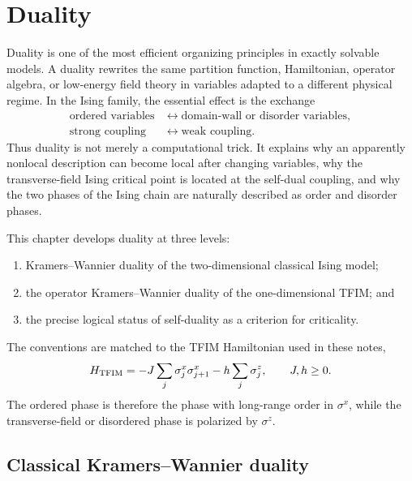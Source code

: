 \chapter{Duality}
\label{chap:duality}

Duality is one of the most efficient organizing principles in exactly solvable
models.  A duality rewrites the same partition function, Hamiltonian, operator
algebra, or low-energy field theory in variables adapted to a different physical
regime.  In the Ising family, the essential effect is the exchange
\begin{equation}
\label{eq:duality-weak-strong-schematic}
\begin{aligned}
    \text{ordered variables}
    &\longleftrightarrow
    \text{domain-wall or disorder variables},\\
    \text{strong coupling}
    &\longleftrightarrow
    \text{weak coupling}.
\end{aligned}
\end{equation}
Thus duality is not merely a computational trick.  It explains why an apparently
nonlocal description can become local after changing variables, why the
transverse-field Ising critical point is located at the self-dual coupling, and
why the two phases of the Ising chain are naturally described as order and
disorder phases.

This chapter develops duality at three levels:
\begin{enumerate}[label=(\roman*)]
    \item Kramers--Wannier duality of the two-dimensional classical Ising model;
    \item the operator Kramers--Wannier duality of the one-dimensional TFIM; and
    \item the precise logical status of self-duality as a criterion for
    criticality.
\end{enumerate}
The conventions are matched to the TFIM Hamiltonian used in these notes,
\begin{equation}
\label{eq:duality-chapter-tfim}
    H_{\rm TFIM}
    =
    -J\sum_j \sigma_j^x\sigma_{j+1}^x
    -h\sum_j \sigma_j^z,
    \qquad
    J,h\geq0 .
\end{equation}
The ordered phase is therefore the phase with long-range order in
$\sigma^x$, while the transverse-field or disordered phase is polarized by
$\sigma^z$.

\section{Classical Kramers--Wannier duality}
\label{sec:classical-kramers-wannier-duality}

